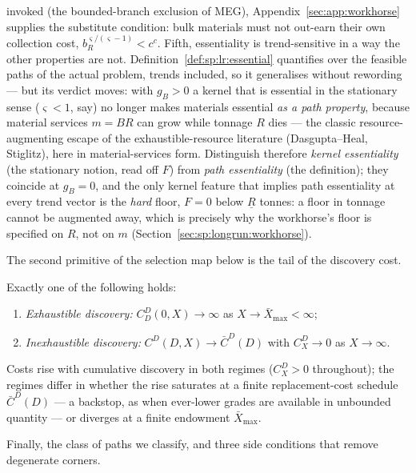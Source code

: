 invoked (the bounded-branch exclusion of MEG), Appendix~\ref{sec:app:workhorse} supplies the
substitute condition: bulk materials must not out-earn their own collection cost,
$b_R^{\varsigma/\left(\varsigma-1\right)}<c^c$. Fifth, essentiality is trend-sensitive in a
way the other properties are not. Definition~\ref{def:sp:lr:essential} quantifies over the
feasible paths of the actual problem, trends included, so it generalises without rewording ---
but its verdict moves: with $g_B>0$ a kernel that is essential in the stationary sense
($\varsigma<1$, say) no longer makes materials essential \emph{as a path property}, because
material services $m=BR$ can grow while tonnage $R$ dies --- the classic resource-augmenting
escape of the exhaustible-resource literature (Dasgupta--Heal, Stiglitz), here in
material-services form. Distinguish therefore \emph{kernel essentiality} (the stationary
notion, read off $F$) from \emph{path essentiality} (the definition); they coincide at
$g_B=0$, and the only kernel feature that implies path essentiality at every trend vector is
the \emph{hard} floor, $F=0$ below $\underline R$ tonnes: a floor in tonnage cannot be
augmented away, which is precisely why the workhorse's floor is specified on $R$, not on $m$
(Section~\ref{sec:sp:longrun:workhorse}).

 The second primitive of the selection map below is the
tail of the discovery cost.

\begin{assumption}\label{ass:sp:lr:discovery}
Exactly one of the following holds:
\begin{enumerate}
    \item[(E)] \emph{Exhaustible discovery:} $C^D_D\left(0,X\right)\to\infty$ as
    $X\to\bar X_{\max}<\infty$;
    \item[(I)] \emph{Inexhaustible discovery:} $C^D\left(D,X\right)\to\bar C^D\left(D\right)$
    with $C^D_X\to0$ as $X\to\infty$.
\end{enumerate}
Costs rise with cumulative discovery in both regimes ($C^D_X>0$ throughout); the regimes differ
in whether the rise saturates at a finite replacement-cost schedule $\bar C^D\left(D\right)$ ---
a backstop, as when ever-lower grades are available in unbounded quantity --- or diverges at a
finite endowment $\bar X_{\max}$.
\end{assumption}

 Finally, the class of paths we classify, and three side conditions that
remove degenerate corners.

